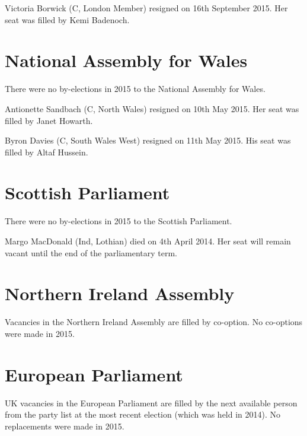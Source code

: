 \documentclass[a4paper,openany]{book}
\begin{document}
Victoria Borwick (C, London Member) resigned on 16th September 2015.  Her seat was filled by Kemi Badenoch.

\section{National Assembly for Wales}

There were no by-elections in 2015 to the National Assembly for Wales.

Antionette Sandbach (C, North Wales) resigned on 10th May 2015.  Her seat was filled by Janet Howarth.

Byron Davies (C, South Wales West) resigned on 11th May 2015.  His seat was filled by Altaf Hussein.

\section{Scottish Parliament}

There were no by-elections in 2015 to the Scottish Parliament.

Margo MacDonald (Ind, Lothian) died on 4th April 2014.  Her seat will remain vacant until the end of the parliamentary term.

\section{Northern Ireland Assembly}

Vacancies in the Northern Ireland Assembly are filled by co-option.  No co-options were made in 2015.


\section{European Parliament}

UK vacancies in the European Parliament are filled by the next available person from the party list at the most recent election (which was held in 2014). 
No replacements were made in 2015.
\end{document}
